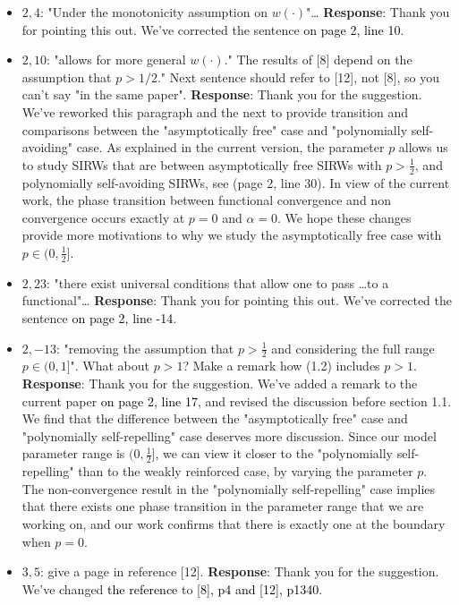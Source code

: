 \documentclass[11pt,a4paper]{article}
\numberwithin{equation}{section}
\newcommand{\corr}[2]{We've changed {\textcolor{black}{#1}} to {\textcolor{black}{#2}}.}
\newcommand{\PL}[2]{\textcolor{black}{on page {#1}, line {#2}}}
\begin{document}
\begin{itemize}
		\item 
		$2,4$: "Under the monotonicity assumption on $w(\cdot)$"\dots
		\subitem \textbf{Response}: Thank you for pointing this out.  We've corrected the sentence \PL{2}{10}. 
		
		\item 
		$2,10$: "allows for more general $w(\cdot)$." The results of [8] depend on the assumption that $p > 1/2.$" Next sentence should refer to [12], not [8], so you can't say "in the same paper".
		\subitem \textbf{Response}: Thank you for the suggestion. We've reworked this paragraph and the next to provide transition and comparisons between the "asymptotically free" case and "polynomially self-avoiding" case. As explained in the current version, the parameter $p$ allows us to study SIRWs that are between asymptotically free SIRWs with $p>\frac{1}{2}$, and polynomially self-avoiding SIRWs, see (page 2, line 30). In view of the current work, the phase transition between functional convergence and non convergence occurs exactly at $p=0$ and $\alpha =0$. We hope these changes provide more motivations to why we study the asymptotically free case with $p\in(0,\frac{1}{2}]$.
		
		
		\item
		$2,23$: "there exist universal conditions that allow one to pass \dots to a functional"\dots
		\subitem \textbf{Response}: Thank you for pointing this out. We've corrected the sentence \PL{2}{-14}. 
		
		\item
		$2,-13$: "removing the assumption that $p > \frac{1}{2}$ and considering the full range $p\in (0,1]$". What about $p > 1$? Make a remark how (1.2) includes $p > 1$.
		\subitem \textbf{Response}: Thank you for the suggestion. We've added a remark to the current paper \PL{2}{17}, and revised the discussion before section 1.1. We find that the difference between the "asymptotically free" case and "polynomially self-repelling" case deserves more discussion. Since our model parameter range is $(0,\frac{1}{2}]$, we can view it closer to the "polynomially self-repelling" than to the weakly reinforced case, by varying the parameter $p$. The non-convergence result in the "polynomially self-repelling" case implies that there exists one phase transition in the parameter range that we are working on, and our work confirms that there is exactly one at the boundary when $p=0$. 
		
		
		\item
		$3,5$: give a page in reference [12].
		\subitem \textbf{Response}: Thank you for the suggestion. \corr{the reference }{[8], p4 and [12],
			p1340}
		

\end{itemize}
\end{document}
